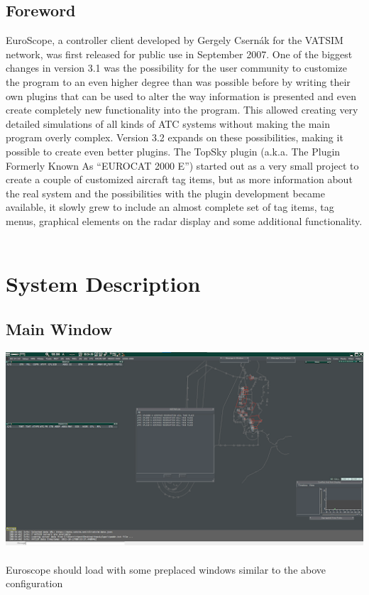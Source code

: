 \documentclass[11pt,a4paper,oldfontcommands]{memoir}
\begin{document}
\section{Foreword}
EuroScope, a controller client developed by Gergely Csernák for the VATSIM network, was first released for public use in September 2007. One of the biggest changes in version 3.1 was the possibility for the user community to customize the program to an even higher degree than was possible before by writing their own plugins that can be used to alter the way information is presented and even create completely new functionality into the program. This allowed creating very detailed simulations of all kinds of ATC systems without making the main program overly complex. Version 3.2 expands on these possibilities, making it possible to create even better plugins.
The TopSky plugin (a.k.a. The Plugin Formerly Known As “EUROCAT 2000 E”) started out as a very small project to create a couple of customized aircraft tag items, but as more information about the real system and the possibilities with the plugin development became available, it slowly grew to include an almost complete set of tag items, tag menus, graphical elements on the radar display and some additional functionality.\\\\

\chapter{System Description}
\section{Main Window}
\includegraphics[width=15cm, keepaspectratio]{img/mainwindow.png}\\\\
Euroscope should load with some preplaced windows similar to the above configuration\\\\
\end{document}
